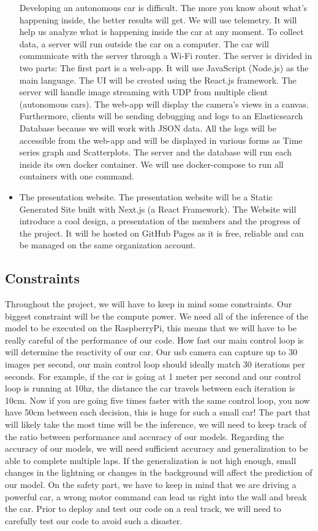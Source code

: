 \documentclass[12pt]{article}
\begin{document}
\begin{itemize}
Developing an autonomous car is difficult. The more you know about what’s happening inside, the better results will get. We will use telemetry. It will help us analyze what is happening inside the car at any moment. To collect data, a server will run outside the car on a computer. The car will communicate with the server through a Wi-Fi router. The server is divided in two parts: The first part is a web-app. It will use JavaScript (Node.js) as the main language. The UI will be created using the React.js framework. The server will handle image streaming with UDP from multiple client (autonomous cars). The web-app will display the camera’s views in a canvas. Furthermore, clients will be sending debugging and logs to an Elasticsearch Database because we will work with JSON data. All the logs will be accessible from the web-app and will be displayed in various forms as Time series graph and Scatterplots. The server and the database will run each inside its own docker container. We will use docker-compose to run all containers with one command.

\item The presentation website. The presentation website will be a Static Generated Site built with Next.js (a React Framework). The Website will introduce a cool design, a presentation of the members and the progress of the project. It will be hosted on GitHub Pages as it is free, reliable and can be managed on the same organization account.
\end{itemize}

\newpage
\subsection{Constraints}
Throughout the project, we will have to keep in mind some constraints.
Our biggest constraint will be the compute power. We need all of the inference of the model to be executed on the RaspberryPi, this means that we will have to be really careful of the performance of our code. How fast our main control loop is will determine the reactivity of our car. Our usb camera can capture up to 30 images per second, our main control loop should ideally match 30 iterations per seconds. For example, if the car is going at 1 meter per second and our control loop is running at 10hz, the distance the car travels between each iteration is 10cm. Now if you are going five times faster with the same control loop, you now have 50cm between each decision, this is huge for such a small car! The part that will likely take the most time will be the inference, we will need to keep track of the ratio between performance and accuracy of our models.
Regarding the accuracy of our models, we will need sufficient accuracy and generalization to be able to complete multiple laps. If the generalization is not high enough, small changes in the lightning or changes in the background will affect the prediction of our model.
On the safety part, we have to keep in mind that we are driving a powerful car, a wrong motor command can lead us right into the wall and break the car. Prior to deploy and test our code on a real track, we will need to carefully test our code to avoid such a disaster.
\end{document}
